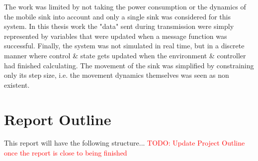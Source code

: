 \noindent The work was limited by not taking the power consumption or the dynamics of the mobile sink into account and only a single sink was considered for this system. In this thesis work the "data" sent during transmission were simply represented by variables that were updated when a message function was successful. Finally, the system was not simulated in real time, but in a discrete manner where control \& state gets updated when the environment \& controller had finished calculating.    
\newline
The movement of the sink was simplified by constraining only its step size, i.e. the movement dynamics themselves was seen as non existent. 



\section{Report Outline}
This report will have the following structure...\newline
\textcolor{red}{TODO: Update Project Outline once the report is close to being finished}

